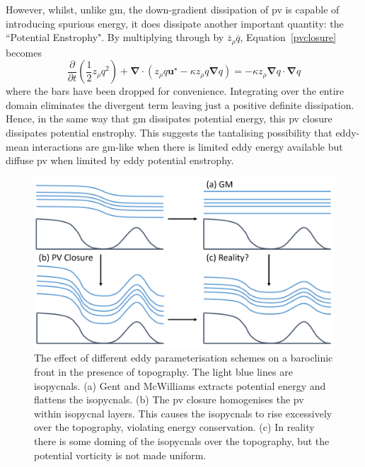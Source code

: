 \documentclass[12pt,a4paper]{report}
\newcommand*\mean[1]{\overline{#1}}
\newcommand*\equref[1]{Equation~\eqref{#1}}
\newcommand*{\half}{\frac{1}{2}}
\begin{document}
                However, whilst, unlike \gls{gm}, the down-gradient
                dissipation of \gls{pv} is capable of introducing spurious energy, it does
                dissipate another important quantity: 
                the ``Potential Enstrophy". By multiplying through 
                by $\mean{z}_{\rho} \mean{q}$, \equref{pvclosure} becomes 
                \begin{equation}
                \frac{\partial  }{\partial t}\left(\half z_{\rho}q^{2}\right) + \boldsymbol{\nabla}\cdot\left(z_{\rho}q\boldsymbol{u}^\star-\kappa z_{\rho}q\boldsymbol{\nabla} q
                \right)=-\kappa z_\rho \boldsymbol{\nabla}q\cdot\boldsymbol{\nabla}q
                \end{equation}
                where the bars have been dropped for convenience.
                Integrating over the entire domain eliminates the divergent term
                leaving just a positive definite dissipation.
                Hence, in the same way that \gls{gm} dissipates potential energy, this
                \gls{pv} closure dissipates potential enstrophy. This suggests the tantalising
                possibility that eddy-mean interactions are \gls{gm}-like when
                there is limited eddy energy available but diffuse \gls{pv} when
                limited by eddy potential enstrophy.
                
                \begin{figure}
                	\centering
                	\includegraphics[width=0.8\linewidth]{am00modified}
                	\caption[Cold-doming]{The effect of different
                		eddy parameterisation schemes on a baroclinic front in
                		the presence of topography. 
                		The light blue lines are isopycnals. (a) 
                		Gent and McWilliams extracts potential energy and
                		flattens the isopycnals. 
                		(b) The \gls{pv} closure homogenises
                		the \gls{pv} within isopycnal layers. This causes the
                		isopycnals to rise excessively over the topography, violating energy
                		conservation. (c) In reality there is some doming of the isopycnals
                		over the topography, but the potential vorticity is not made uniform.
                		}
                	\label{fig:Colddoming}
                \end{figure}
                
\end{document}
